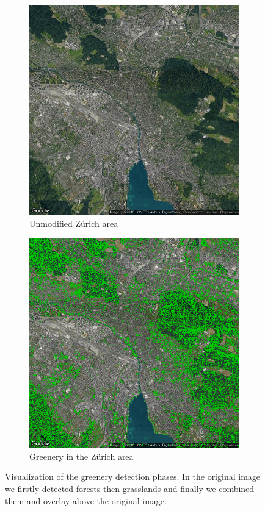 \documentclass[letterpaper]{article}
\begin{document}
\begin{figure}
    \begin{subfigure}{.22\textwidth}
        \centering
        \includegraphics[width=.95\linewidth]{../images/greenery/Zurich.png}
        \caption[width=.2\textwidth]{Unmodified Zürich area}
    \end{subfigure}%
    \begin{subfigure}{.22\textwidth}
        \centering
        \includegraphics[width=.95\linewidth]{../images/greenery/Zurich_greenery.png}
        \caption[width=.2\textwidth]{Greenery in the Zürich area}
    \end{subfigure}
    \caption{Visualization of the greenery detection phases. In the original image we firstly detected forests then
             grasslands and finally we combined them and overlay above the original image.}
    \label{fig:ZurichGreenery}
\end{figure}
\end{document}
